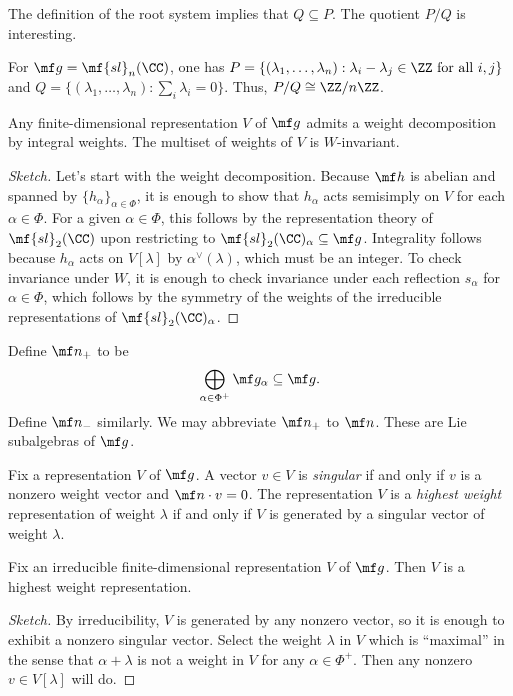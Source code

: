 \documentclass{article}
\begin{document}
\begin{remark}
	The definition of the root system implies that $Q\subseteq P$. The quotient $P/Q$ is interesting.
\end{remark}
\begin{example}
	For $\mf g=\mf{sl}_n(\CC)$, one has $P=\{(\lambda_1,\ldots,\lambda_n):\lambda_i-\lambda_j\in\ZZ\text{ for all }i,j\}$ and $Q=\{(\lambda_1,\ldots,\lambda_n):\sum_i\lambda_i=0\}$. Thus, $P/Q\cong\ZZ/n\ZZ$.
\end{example}
\begin{lemma}
	Any finite-dimensional representation $V$ of $\mf g$ admits a weight decomposition by integral weights. The multiset of weights of $V$ is $W$-invariant.
\end{lemma}
\begin{proof}[Sketch]
	Let's start with the weight decomposition. Because $\mf h$ is abelian and spanned by $\{h_\alpha\}_{\alpha\in\Phi}$, it is enough to show that $h_\alpha$ acts semisimply on $V$ for each $\alpha\in\Phi$. For a given $\alpha\in\Phi$, this follows by the representation theory of $\mf{sl}_2(\CC)$ upon restricting to $\mf{sl}_2(\CC)_\alpha\subseteq\mf g$. Integrality follows because $h_\alpha$ acts on $V[\lambda]$ by $\alpha^\lor(\lambda)$, which must be an integer. To check invariance under $W$, it is enough to check invariance under each reflection $s_\alpha$ for $\alpha\in\Phi$, which follows by the symmetry of the weights of the irreducible representations of $\mf{sl}_2(\CC)_\alpha$.
\end{proof}
\begin{notation}
	Define $\mf n_+$ to be
	\[\bigoplus_{\alpha\in\Phi^+}\mf g_\alpha\subseteq\mf g.\]
	Define $\mf n_-$ similarly. We may abbreviate $\mf n_+$ to $\mf n$. These are Lie subalgebras of $\mf g$.
\end{notation}
\begin{definition}[singular]
	Fix a representation $V$ of $\mf g$. A vector $v\in V$ is \textit{singular} if and only if $v$ is a nonzero weight vector and $\mf n\cdot v=0$. The representation $V$ is a \textit{highest weight} representation of weight $\lambda$ if and only if $V$ is generated by a singular vector of weight $\lambda$.
\end{definition}
\begin{lemma}
	Fix an irreducible finite-dimensional representation $V$ of $\mf g$. Then $V$ is a highest weight representation.
\end{lemma}
\begin{proof}[Sketch]
	By irreducibility, $V$ is generated by any nonzero vector, so it is enough to exhibit a nonzero singular vector. Select the weight $\lambda$ in $V$ which is ``maximal'' in the sense that $\alpha+\lambda$ is not a weight in $V$ for any $\alpha\in\Phi^+$. Then any nonzero $v\in V[\lambda]$ will do.
\end{proof}
\end{document}
